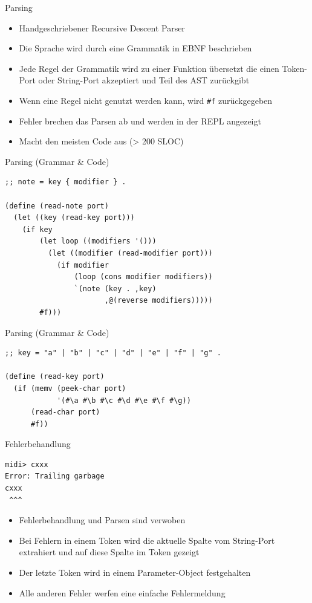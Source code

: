 \documentclass[presentation]{beamer}
\begin{document}
\begin{frame}[fragile,label=sec-4-12]{Parsing}
 \begin{itemize}
\item Handgeschriebener Recursive Descent Parser
\item Die Sprache wird durch eine Grammatik in EBNF beschrieben
\item Jede Regel der Grammatik wird zu einer Funktion übersetzt die einen
Token-Port oder String-Port akzeptiert und Teil des AST zurückgibt
\item Wenn eine Regel nicht genutzt werden kann, wird \texttt{\#f} zurückgegeben
\item Fehler brechen das Parsen ab und werden in der REPL angezeigt
\item Macht den meisten Code aus (> 200 SLOC)
\end{itemize}
\end{frame}

\begin{frame}[fragile,label=sec-4-13]{Parsing (Grammar \& Code)}
 \begin{verbatim}
;; note = key { modifier } .

(define (read-note port)
  (let ((key (read-key port)))
    (if key
        (let loop ((modifiers '()))
          (let ((modifier (read-modifier port)))
            (if modifier
                (loop (cons modifier modifiers))
                `(note (key . ,key)
                       ,@(reverse modifiers)))))
        #f)))
\end{verbatim}
\end{frame}

\begin{frame}[fragile,label=sec-4-14]{Parsing (Grammar \& Code)}
 \begin{verbatim}
;; key = "a" | "b" | "c" | "d" | "e" | "f" | "g" .

(define (read-key port)
  (if (memv (peek-char port)
            '(#\a #\b #\c #\d #\e #\f #\g))
      (read-char port)
      #f))
\end{verbatim}
\end{frame}

\begin{frame}[fragile,label=sec-4-15]{Fehlerbehandlung}
 \begin{verbatim}
midi> cxxx
Error: Trailing garbage
cxxx
 ^^^
\end{verbatim}

\begin{itemize}
\item Fehlerbehandlung und Parsen sind verwoben
\item Bei Fehlern in einem Token wird die aktuelle Spalte vom String-Port
extrahiert und auf diese Spalte im Token gezeigt
\item Der letzte Token wird in einem Parameter-Object festgehalten
\item Alle anderen Fehler werfen eine einfache Fehlermeldung
\end{itemize}
\end{frame}
\end{document}
